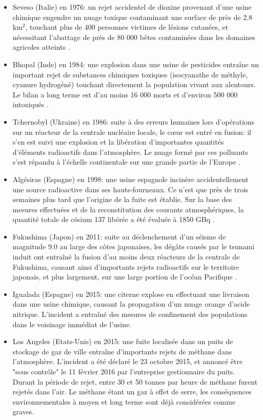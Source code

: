 	\begin{itemize}
		\item Seveso (Italie) en 1976: un rejet accidentel de dioxine provenant d'une usine chimique engendre un nuage toxique contaminant une surface de près de 2.8 km$^2$, touchant plus de 400 personnes victimes de lésions cutanées, et nécessitant l'abattage de près de 80 000 bêtes contaminées dans les domaines agricoles atteints \cite{Seveso1976}. 
		
		\item Bhopal (Inde) en 1984: une explosion dans une usine de pesticides entraîne un important rejet de substances chimiques toxiques (isocyanathe de méthyle, cyanure hydrogéné) touchant directement la population vivant aux alentours. Le bilan a long terme est d'au moins 16 000 morts et d'environ 500 000 intoxiqués \cite{Bhopal1984}.
		
		\item Tchernobyl (Ukraine) en 1986: suite à des erreurs humaines lors d'opérations sur un réacteur de la centrale nucléaire locale, le c\oe{}ur est entré en fusion: il s'en est suivi une explosion et la libération d'importantes quantités d'éléments radioactifs dans l'atmosphère. Le nuage formé par ces polluants s'est répandu à l'échelle continentale sur une grande partie de l'Europe \cite{Repussard2006}.
		
		\item Algésiras (Espagne) en 1998: une usine espagnole incinère accidentellement une source radioactive dans ses hauts-fourneaux. Ce n'est que près de trois semaines plus tard que l'origine de la fuite est établie. Sur la base des mesures effectuées et de la reconstitution des courants atmosphériques, la quantité totale de césium 137 libérée a été évaluée à 1850 GBq \cite{Estevan2003}.
		
		\item Fukushima (Japon) en 2011: suite au déclenchement d'un séisme de magnitude 9.0 au large des côtes japonaises, les dégâts causés par le tsunami induit ont entraîné la fusion d'au moins deux réacteurs de la centrale de Fukushima, causant ainsi d'importants rejets radioactifs sur le territoire japonais, et plus largement, sur une large portion de l'océan Pacifique \cite{IRSN2012}.
		
		\item Igualada (Espagne) en 2015: une citerne explose en effectuant une livraison dans une usine chimique, causant la propagation d'un nuage orange d'acide nitrique. L'incident a entraîné des mesures de confinement des populations dans le voisinage immédiat de l'usine.
		\item Los Angeles (Etats-Unis) en 2015: une fuite localisée dans un puits de stockage de gaz de ville entraîne d'importants rejets de méthane dans l'atmosphère. L'incident a été déclaré le 23 octobre 2015, et annoncé être "sous contrôle" le 11 février 2016 par l'entreprise gestionnaire du puits. Durant la période de rejet, entre 30 et 50 tonnes par heure de méthane furent rejetés dans l'air. Le méthane étant un gaz à effet de serre, les conséquences environnementales à moyen et long terme sont déjà considérées comme graves.\\
	\end{itemize}
	
